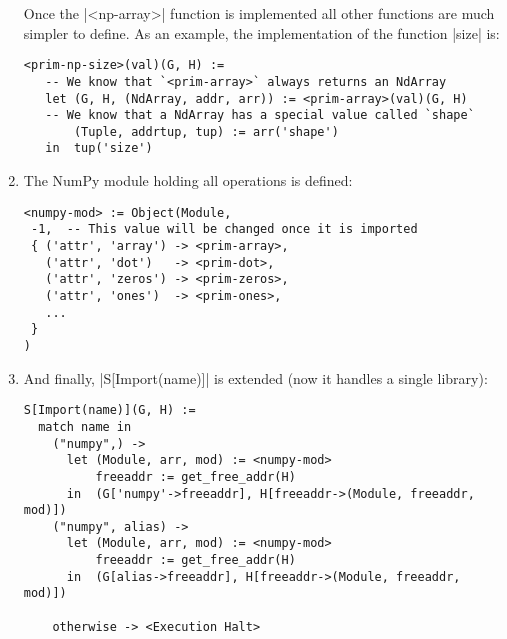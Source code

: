\begin{enumerate}
  Once the \pycode|<np-array>| function is
  implemented all other functions are much simpler to define. As an
  example, the implementation of the function \pycode|size| is:

\begin{verbatim}
<prim-np-size>(val)(G, H) :=
   -- We know that `<prim-array>` always returns an NdArray
   let (G, H, (NdArray, addr, arr)) := <prim-array>(val)(G, H)
   -- We know that a NdArray has a special value called `shape`
       (Tuple, addrtup, tup) := arr('shape')
   in  tup('size')
\end{verbatim}
%
\item
  The NumPy module holding all operations is defined:

\begin{verbatim}
<numpy-mod> := Object(Module,
 -1,  -- This value will be changed once it is imported
 { ('attr', 'array') -> <prim-array>,
   ('attr', 'dot')   -> <prim-dot>,
   ('attr', 'zeros') -> <prim-zeros>,
   ('attr', 'ones')  -> <prim-ones>,
   ...
 }
)
\end{verbatim}
\item
  And finally, \pycode|S[Import(name)]| is extended (now it handles
  a single library):

\begin{verbatim}
S[Import(name)](G, H) :=
  match name in
    ("numpy",) ->
      let (Module, arr, mod) := <numpy-mod>
          freeaddr := get_free_addr(H)
      in  (G['numpy'->freeaddr], H[freeaddr->(Module, freeaddr, mod)])
    ("numpy", alias) ->
      let (Module, arr, mod) := <numpy-mod>
          freeaddr := get_free_addr(H)
      in  (G[alias->freeaddr], H[freeaddr->(Module, freeaddr, mod)])

    otherwise -> <Execution Halt>
\end{verbatim}
\end{enumerate}


